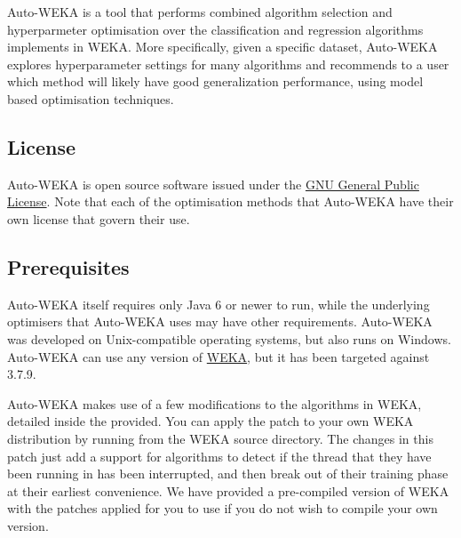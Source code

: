 

Auto-WEKA is a tool that performs combined algorithm selection and hyperparmeter optimisation over the classification and regression algorithms implements in WEKA. More specifically, given a specific dataset, Auto-WEKA explores hyperparameter settings for many algorithms and recommends to a user which method will likely have good generalization performance, using model based optimisation techniques.


\subsection{License}

Auto-WEKA is open source software issued under the \href{http://www.gnu.org/licenses/gpl.html}{GNU General Public License}. Note that each of the optimisation methods that Auto-WEKA have their own license that govern their use.

\subsection{Prerequisites}

Auto-WEKA itself requires only Java 6 or newer to run, while the underlying optimisers that Auto-WEKA uses may have other requirements. Auto-WEKA was developed on Unix-compatible operating systems, but also runs on Windows. Auto-WEKA can use any version of \href{http://www.cs.waikato.ac.nz/ml/weka/}{WEKA}, but it has been targeted against 3.7.9. 

Auto-WEKA makes use of a few modifications to the algorithms in WEKA, detailed inside the  provided. You can apply the patch to your own WEKA distribution by running  from the WEKA source directory. The changes in this patch just add a support for algorithms to detect if the thread that they have been running in has been interrupted, and then break out of their training phase at their earliest convenience. We have provided a pre-compiled version of WEKA with the patches applied for you to use if you do not wish to compile your own version.

